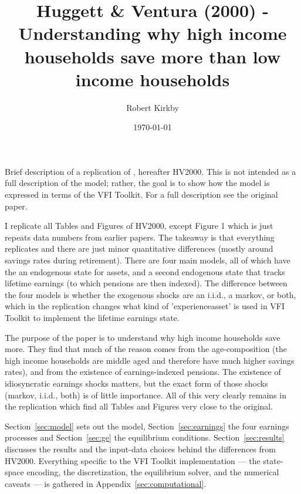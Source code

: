 \documentclass[11pt,fleqn]{article}
\begin{document}
\newcommand{\rob}[1]{{\noindent\color{blue}\bf #1}}
\newcommand{\robc}[1]{{\noindent\color{blue}\bf R: #1}}

\title{Huggett \& Ventura (2000) - Understanding why high income households save more than low income households}
\author{Robert Kirkby}
\date{\today}
\maketitle

Brief description of a replication of \cite*{HuggettVentura2000}, hereafter HV2000. This is not intended as a full description of the model; rather, the goal is to show how the model is expressed in terms of the VFI Toolkit. For a full description see the original paper.

I replicate all Tables and Figures of HV2000, except Figure 1 which is just repeats data numbers from earlier papers. The takeaway is that everything replicates and there are just minor quantitative differences (mostly around savings rates during retirement). There are four main models, all of which have the an endogenous state for assets, and a second endogenous state that tracks lifetime earnings (to which pensions are then indexed). The difference between the four models is whether the exogenous shocks are an i.i.d., a markov, or both, which in the replication changes what kind of 'experienceasset' is used in VFI Toolkit to implement the lifetime earnings state.

The purpose of the paper is to understand why high income households save more. They find that much of the reason comes from the age-composition (the high income households are middle aged and therefore have much higher savings rates), and from the existence of earnings-indexed pensions. The existence of idiosyncratic earnings shocks matters, but the exact form of those shocks (markov, i.i.d., both) is of little importance. All of this very clearly remains in the replication which find all Tables and Figures very close to the original.

Section~\ref{sec:model} sets out the model, Section~\ref{sec:earnings} the four earnings processes and Section~\ref{sec:ge} the equilibrium conditions. Section~\ref{sec:results} discusses the results and the input-data choices behind the differences from HV2000. Everything specific to the VFI Toolkit implementation --- the state-space encoding, the discretization, the equilibrium solver, and the numerical caveats --- is gathered in Appendix~\ref{sec:computational}.
\end{document}
